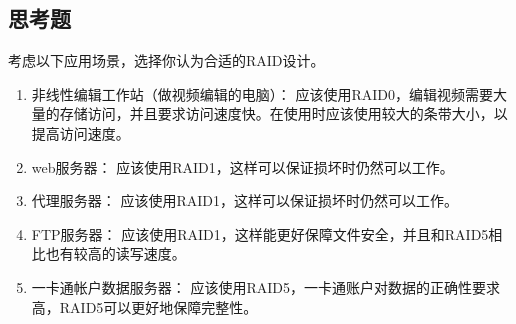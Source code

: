\documentclass[a4paper,twoside]{article}
\begin{document}
\begin{spacing}{1.2}
\section{思考题}
考虑以下应用场景，选择你认为合适的RAID设计。
\begin{enumerate}
\item 非线性编辑工作站（做视频编辑的电脑）：
应该使用RAID0，编辑视频需要大量的存储访问，并且要求访问速度快。在使用时应该使用较大的条带大小，以提高访问速度。
\item web服务器：
应该使用RAID1，这样可以保证损坏时仍然可以工作。
\item 代理服务器：
应该使用RAID1，这样可以保证损坏时仍然可以工作。
\item FTP服务器：
应该使用RAID1，这样能更好保障文件安全，并且和RAID5相比也有较高的读写速度。
\item 一卡通帐户数据服务器：
应该使用RAID5，一卡通账户对数据的正确性要求高，RAID5可以更好地保障完整性。
\end{enumerate}


\end{spacing}
\end{document}
